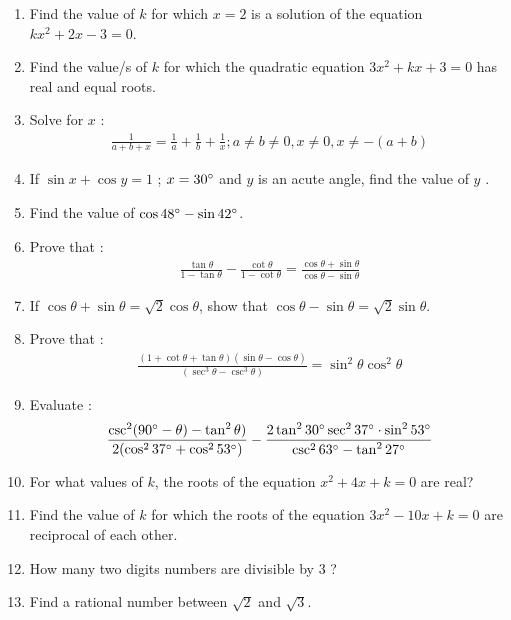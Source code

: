 \begin{enumerate}
\item Find the value of $k$ for which $x = 2$ is a solution of the equation
  $kx^2 + 2x - 3 = 0$.
  
\item Find the value/s of $k$ for which the quadratic equation $3x^{2} + kx + 3 = 0$
has real and equal roots.


\item Solve for $x$ :
\begin{align*}
    {\frac {1}{a+b+x}} = {\frac{1}{a}} + {\frac{1}{b}} + {\frac{1}{x}};  {a\neq b \neq 0},{x \neq 0},{x \neq -(a+b)}
\end{align*}

\item If $\sin{x} + \cos{y}= 1$ ; $x=30\degree$  and  $y$ is an acute angle, find the value of $y$ .

\item Find the value of $\cos {48\degree} - \sin {42\degree}$.

\item Prove that :
\begin{align*}
   {\frac{\tan\theta}{1-\tan\theta}} - {\frac{\cot\theta}{1-\cot\theta}}={\frac{\cos\theta+ \sin\theta}{\cos\theta-\sin\theta}}
\end{align*} 

\item If ${\cos\theta + \sin\theta} = {\sqrt 2}{\cos\theta}$, show that ${\cos\theta - \sin\theta} = {\sqrt 2}{\sin\theta}$.

\item Prove that :
\begin{align*}
    {\frac{(1+\cot\theta+\tan\theta)(\sin\theta-\cos\theta)}{(\sec^3\theta-\csc^3\theta)}} = \sin^2\theta \cos^2\theta
\end{align*}

\item Evaluate :
\begin{align*}
    {\frac{\csc^2(90\degree - \theta)-\tan^2\theta)}{2(\cos^2 37\degree + \cos^2 53\degree)}} - {\frac{2\tan^2 30\degree \sec^2 37\degree \cdot \sin^2 53\degree}{\csc^2 63\degree - \tan^2 27\degree}} 
\end{align*}	
\item For what values of $k$, the roots of the equation $x^2+4x+k = 0$ are real?
  \item Find the value of $k$ for which the roots of the equation $3x^2-10x+k=0$ are reciprocal of each other.
  \item How many two digits numbers are divisible by $3$ ?
  \item Find a rational number between $\sqrt{2}$ and $\sqrt{3}$.
  

\end{enumerate}
